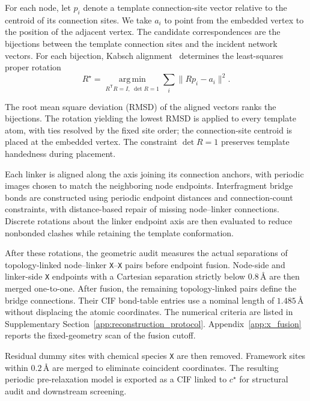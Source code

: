 \documentclass[a5paper, 10pt]{article}
\begin{document}
For each node, let $p_i$ denote a template connection-site vector relative to the centroid of its connection sites. We take $a_i$ to point from the embedded vertex to the position of the adjacent vertex. The candidate correspondences are the bijections between the template connection sites and the incident network vectors. For each bijection, Kabsch alignment~\cite{kabsch1976solution,lawrence2019kabschumeyama} determines the least-squares proper rotation%
\begin{equation}
R^\star=\underset{R^{\mathsf T}R=I,\;\det R=1}{\operatorname{arg\,min}}
\sum_i\lVert R p_i-a_i\rVert^2.
\label{eq:kabsch_alignment}
\end{equation}

The root mean square deviation (RMSD) of the aligned vectors ranks the bijections. The rotation yielding the lowest RMSD is applied to every template atom, with ties resolved by the fixed site order; the connection-site centroid is placed at the embedded vertex. The constraint $\det R=1$ preserves template handedness during placement.%

Each linker is aligned along the axis joining its connection anchors, with periodic images chosen to match the neighboring node endpoints. Interfragment bridge bonds are constructed using periodic endpoint distances and connection-count constraints, with distance-based repair of missing node--linker connections. Discrete rotations about the linker endpoint axis are then evaluated to reduce nonbonded clashes while retaining the template conformation.

After these rotations, the geometric audit measures the actual separations of topology-linked node--linker \texttt{X}--\texttt{X} pairs before endpoint fusion. Node-side and linker-side \texttt{X} endpoints with a Cartesian separation strictly below $0.8\,\text{\AA}$ are then merged one-to-one. After fusion, the remaining topology-linked pairs define the bridge connections. Their CIF bond-table entries use a nominal length of $1.485\,\text{\AA}$ without displacing the atomic coordinates. The numerical criteria are listed in Supplementary Section~\ref{app:reconstruction_protocol}. Appendix~\ref{app:x_fusion} reports the fixed-geometry scan of the fusion cutoff.

\begingroup\setlength{\emergencystretch}{1em}
Residual dummy sites with chemical species \texttt{X} are then removed. Framework sites within $0.2\,\text{\AA}$ are merged to eliminate coincident coordinates. The resulting periodic pre-relaxation model is exported as a CIF linked to $c^\star$ for structural audit and downstream screening.
\par\endgroup
\end{document}

